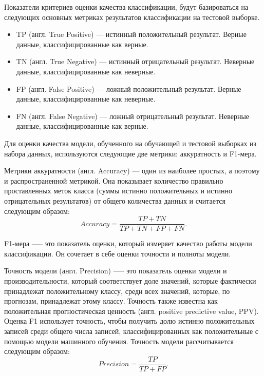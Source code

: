 Показатели критериев оценки качества классификации, будут базироваться на следующих основных метриках результатов классификации на тестовой выборке.

\begin{itemize}[label = ---]
    \item TP (англ. True Positive) –-- истинный положительный результат. Верные данные, классифицированные как верные.
    \item TN (англ. True Negative) –-- истинный отрицательный результат. Неверные данные, классифицированные как неверные.
    \item FP (англ. False Positive) –-- ложный положительный результат. Верные данные, классифицированные как неверные.
    \item FN (англ. False Negative) –-- ложный отрицательный результат. Неверные данные, классифицированные как верные.
\end{itemize}

Для оценки качества модели, обученного на обучающей и тестовой выборках из набора данных, используются следующие две метрики: аккуратность и F1-мера.

Метрики аккуратности (англ. Accuracy) --- один из наиболее простых, а поэтому и распространенной метрикой. Она показывает количество правильно проставленных меток класса (суммы истинно положительных и истинно отрицательных результатов) от общего количества данных и считается следующим образом:
\begin{equation}
    Accuracy = \frac{TP + TN}{TP + TN + FP + FN}.
\end{equation}

F1-мера —-- это показатель оценки, который измеряет качество работы модели классификации. Он сочетает в себе оценки точности и полноты модели.

Точность модели (англ. Precision) —-- это показатель оценки модели и производительности, который соответствует доле значений, которые фактически принадлежат положительному классу, среди всех значений, которые, по прогнозам, принадлежат этому классу. Точность также известна как положительная прогностическая ценность (англ. positive predictive value, PPV). Оценка F1 использует точность, чтобы получить долю истинно положительных записей среди общего числа записей, классифицированных как положительные с помощью модели машинного обучения. Точность модели рассчитывается следующим образом:
\begin{equation}
    Precision = \frac{TP}{TP + FP}.
\end{equation}

